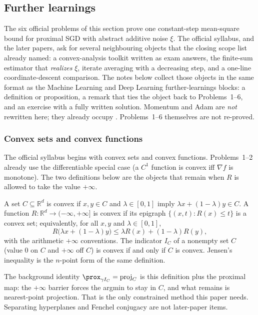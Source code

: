 \subsection{Further learnings}
\label{subsec:optu}

The six official problems of this section prove one constant-step mean-square bound for proximal SGD with abstract additive noise $\xi$. The official syllabus, and the later papers, ask for several neighbouring objects that the closing scope list already named: a convex-analysis toolkit written as exam answers, the finite-sum estimator that \emph{realizes} $\xi$, iterate averaging with a decreasing step, and a one-line coordinate-descent comparison. The notes below collect those objects in the same format as the Machine Learning and Deep Learning further-learnings blocks: a definition or proposition, a remark that ties the object back to Problems~1--6, and an exercise with a fully written solution. Momentum and Adam are \emph{not} rewritten here; they already occupy . Problems~1--6 themselves are not re-proved.


\subsubsection{Convex sets and convex functions}
\label{subsubsec:optu-convex}

The official syllabus begins with convex sets and convex functions. Problems~1--2 already use the differentiable special case (a $C^1$ function is convex iff $\nabla f$ is monotone). The two definitions below are the objects that remain when $R$ is allowed to take the value $+\infty$.

\begin{definition}
\label{def:optu-convex}
A set $C\subseteq\mathbb{R}^d$ is convex if $x,y\in C$ and $\lambda\in[0,1]$ imply $\lambda x+(1-\lambda)y\in C$. A function $R:\mathbb{R}^d\to(-\infty,+\infty]$ is convex if its epigraph $\{(x,t):R(x)\le t\}$ is a convex set; equivalently, for all $x,y$ and $\lambda\in[0,1]$,
\[
R\bigl(\lambda x+(1-\lambda)y\bigr)
\le
\lambda R(x)+(1-\lambda)R(y),
\]
with the arithmetic $+\infty$ conventions. The indicator $I_C$ of a nonempty set $C$ (value $0$ on $C$ and $+\infty$ off $C$) is convex if and only if $C$ is convex. Jensen's inequality is the $n$-point form of the same definition.
\end{definition}

\begin{remark}
\label{rem:optu-indicator}
The background identity $\prox_{\gamma I_C}=\mathrm{proj}_C$ is this definition plus the proximal map: the $+\infty$ barrier forces the argmin to stay in $C$, and what remains is nearest-point projection. That is the only constrained method this paper needs. Separating hyperplanes and Fenchel conjugacy are not later-paper items.
\end{remark}

